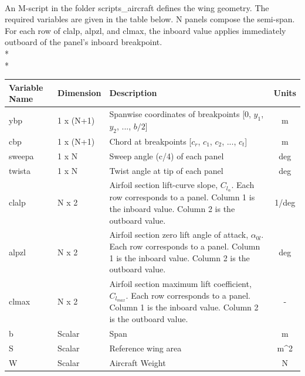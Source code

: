 \documentclass{article}
\begin{document}
\paragraph{}
An M-script in the folder scripts\_aircraft defines the wing geometry.
The required variables are given in the table below.  N panels compose
the semi-span.  For each row of clalp, alpzl, and clmax, the inboard
value applies immediately outboard of the panel's inboard
breakpoint.\\*\\*
\begin{tabular}{|l|l|p{2.5in}|c|}
  \hline
  \textbf{Variable Name} &
  \textbf{Dimension} &
  \textbf{Description} &
  \textbf{Units}
  \\
  \hline
  ybp & 1 x (N+1) &
  Spanwise coordinates of breakpoints [$0$, $y_1$, $y_2$, ..., $b/2$] &
  m
  \\
  \hline
  cbp & 1 x (N+1) &
  Chord at breakpoints [$c_r$, $c_1$, $c_2$, ..., $c_t$] &
  m
  \\
  \hline
  sweepa & 1 x N &
  Sweep angle (c/4) of each panel &
  deg
  \\
  \hline
  twista & 1 x N &
  Twist angle at tip of each panel &
  deg
  \\
  \hline
  clalp & N x 2 &
  Airfoil section lift-curve slope, $C_{l_\alpha}$.  Each row
  corresponds to a panel.  Column 1 is the inboard value.  Column 2 is
  the outboard value. &
  1/deg
  \\
  \hline
  alpzl & N x 2 &
  Airfoil section zero lift angle of attack, $\alpha_{0l}$.  Each row
  corresponds to a panel.  Column 1 is the inboard value.  Column 2 is
  the outboard value. &
  deg
  \\
  \hline
  clmax & N x 2 &
  Airfoil section maximum lift coefficient, $C_{l_{max}}$.  Each row
  corresponds to a panel.  Column 1 is the inboard value.  Column 2 is
  the outboard value. &
  -
  \\
  \hline
  b & Scalar &
  Span &
  m
  \\
  \hline
  S & Scalar &
  Reference wing area &
  m\^{}2
  \\
  \hline
  W & Scalar &
  Aircraft Weight &
  N
  \\
  \hline
\end{tabular}
\end{document}
